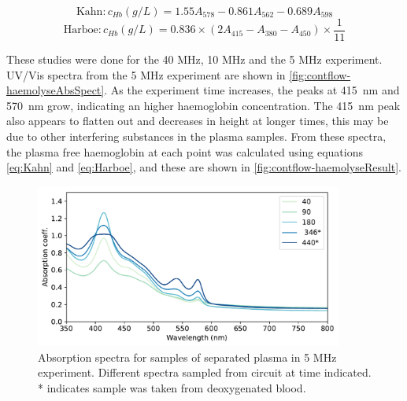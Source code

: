 \begin{equation}
\mathrm{Kahn: } c_{Hb} (\si{g/L}) = 1.55A_{578} - 0.861A_{562} - 0.689A_{598}
\label{eq:Kahn}
\end{equation}
\begin{equation}
\mathrm{Harboe: } c_{Hb} (\si{g/L}) = 0.836 \times \left( 2A_{415} - A_{380} - A_{450}\right) \times \frac{1}{11}
\label{eq:Harboe}
\end{equation}

These studies were done for the 40 MHz, 10 MHz and the 5 MHz experiment.
UV/Vis spectra from the 5 MHz experiment are shown in \autoref{fig:contflow-haemolyseAbsSpect}.
As the experiment time increases, the peaks at \SI{415}{nm} and \SI{570}{nm} grow, indicating an higher haemoglobin concentration.
The \SI{415}{nm} peak also appears to flatten out and decreases in height at longer times, this may be due to other interfering substances in the plasma samples.
From these spectra, the plasma free haemoglobin at each point was calculated using equations \ref{eq:Kahn} and \ref{eq:Harboe}, and these are shown in \autoref{fig:contflow-haemolyseResult}.

\begin{figure}[ht]
\centering
\includegraphics[width=0.9\textwidth]{figures/contflow/haemolyseAbsSpect.pdf}
\caption[Absorption spectra for samples of separated plasma in 5 MHz experiment]{Absorption spectra for samples of separated plasma in 5 MHz experiment. Different spectra sampled from circuit at time indicated. * indicates sample was taken from deoxygenated blood.}
\label{fig:contflow-haemolyseAbsSpect}
\end{figure}

